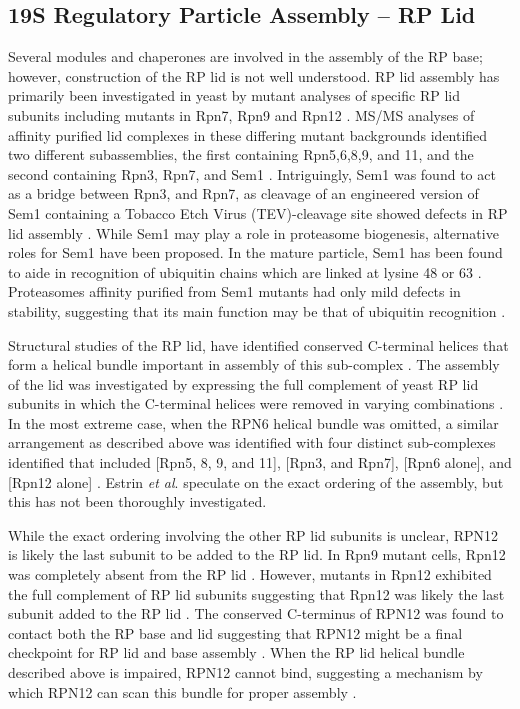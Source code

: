 \subsection{19S Regulatory Particle Assembly – RP Lid}
	Several modules and chaperones are involved in the assembly of the RP base; however, construction of the RP lid is not well understood. RP lid assembly has primarily been investigated in yeast by mutant analyses of specific RP lid subunits including mutants in Rpn7, Rpn9 and Rpn12 \citep{fukunaga10}. MS/MS analyses of affinity purified lid complexes in these differing mutant backgrounds identified two different subassemblies, the first containing Rpn5,6,8,9, and 11, and the second containing Rpn3, Rpn7, and Sem1 \citep{fukunaga10}. Intriguingly, Sem1 was found to act as a bridge between Rpn3, and Rpn7, as cleavage of an engineered version of Sem1 containing a Tobacco Etch Virus (TEV)-cleavage site showed defects in RP lid assembly \citep{tomko14}. While Sem1 may play a role in proteasome biogenesis, alternative roles for Sem1 have been proposed.  In the mature particle, Sem1 has been found to aide in recognition of ubiquitin chains which are linked at lysine 48 or 63 \citep{paraskevopoulos14}. Proteasomes affinity purified from Sem1 mutants had only mild defects in stability, suggesting that its main function may be that of ubiquitin recognition \citep{paraskevopoulos14}.
	
	Structural studies of the RP lid, have identified conserved C-terminal helices that form a helical bundle important in assembly of this sub-complex \citep{estrin13}. The assembly of the lid was investigated by expressing the full complement of yeast RP lid subunits in which the C-terminal helices were removed in varying combinations \citep{estrin13}. In the most extreme case, when the RPN6 helical bundle was omitted, a similar arrangement as described above was identified with four distinct sub-complexes identified that included [Rpn5, 8, 9, and 11], [Rpn3, and Rpn7], [Rpn6 alone], and [Rpn12 alone] \citep{estrin13}. Estrin \textit{et al}. speculate on the exact ordering of the assembly, but this has not been thoroughly investigated.

	While the exact ordering involving the other RP lid subunits is unclear, RPN12 is likely the last subunit to be added to the RP lid. In Rpn9 mutant cells, Rpn12 was completely absent from the RP lid \citep{fukunaga10}. However, mutants in Rpn12 exhibited the full complement of RP lid subunits suggesting that Rpn12 was likely the last subunit added to the RP lid \citep{tomko11}. The conserved C-terminus of RPN12 was found to contact both the RP base and lid suggesting that RPN12 might be a final checkpoint for RP lid and base assembly \citep{tomko11}. When the RP lid helical bundle described above is impaired, RPN12 cannot bind, suggesting a mechanism by which RPN12 can scan this bundle for proper assembly \citep{estrin13}.
	 
